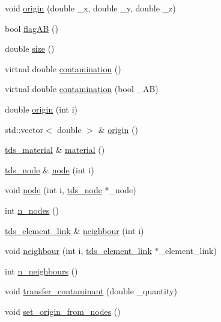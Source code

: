 \begin{DoxyCompactItemize}
\item 
void \hyperlink{classtds__element_ae2355a832ead2e50c17a8782ad8d1496}{origin} (double \+\_\+x, double \+\_\+y, double \+\_\+z)
\item 
bool \hyperlink{classtds__element_a44d414a3db34a21320fb70f86f401734}{flag\+AB} ()
\item 
double \hyperlink{classtds__element_a670d658914fce47e7312a170634c47ea}{size} ()
\item 
virtual double \hyperlink{classtds__element_a7dcc7e1ad86d6c64368d1e6215cb662a}{contamination} ()
\item 
virtual double \hyperlink{classtds__element_a5467abfd0fc166336152a668f0f9b67e}{contamination} (bool \+\_\+\+AB)
\item 
double \hyperlink{classtds__element_a737aecedf7dbb0016d0863878f36ca95}{origin} (int i)
\item 
std\+::vector$<$ double $>$ \& \hyperlink{classtds__element_adf1bf79b2b09a06dd6a050cbb90512ce}{origin} ()
\item 
\hyperlink{classtds__material}{tds\+\_\+material} \& \hyperlink{classtds__element_ac06226815fbc171b44a45ef854fe4afd}{material} ()
\item 
\hyperlink{classtds__node}{tds\+\_\+node} \& \hyperlink{classtds__element_a66d829f294782942cf58f6b296f0c3c7}{node} (int i)
\item 
void \hyperlink{classtds__element_a48384c3ca84b54177be7cd67bbc2a5d6}{node} (int i, \hyperlink{classtds__node}{tds\+\_\+node} $\ast$\+\_\+node)
\item 
int \hyperlink{classtds__element_ab79398ce1ba6a67ac5510e44d51b6418}{n\+\_\+nodes} ()
\item 
\hyperlink{classtds__element__link}{tds\+\_\+element\+\_\+link} \& \hyperlink{classtds__element_a83225c7ac9e0577fe9725945319e8783}{neighbour} (int i)
\item 
void \hyperlink{classtds__element_aa14cf978563685ebbf877f6f7518bcb9}{neighbour} (int i, \hyperlink{classtds__element__link}{tds\+\_\+element\+\_\+link} $\ast$\+\_\+element\+\_\+link)
\item 
int \hyperlink{classtds__element_ac41dd60ba9599e0277fe3438f4a2aad0}{n\+\_\+neighbours} ()
\item 
void \hyperlink{classtds__element_ab100134034c37c8c7f6872333cd619f5}{transfer\+\_\+contaminant} (double \+\_\+quantity)
\item 
void \hyperlink{classtds__element_a365817d60d2da273a512db3c8a3a1617}{set\+\_\+origin\+\_\+from\+\_\+nodes} ()
\item 

\end{DoxyCompactItemize}

